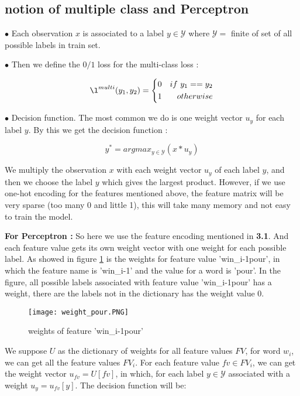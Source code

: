 \documentclass{article}
\def\YY{{\mathcal{Y}}}
\begin{document}
\subsection{notion of multiple class and Perceptron}
$\bullet$ Each observation $x$ is associated to a label $y \in \YY$ where $\YY = $ finite of set of all possible labels in train set. 

$\bullet$ Then we define the $0/1$ loss for the multi-class loss : 

\begin{equation}
\l^{multi}(y_1, y_2) = \left\{
\begin{aligned}
0 & & if\ y_1 == y_2\\
1 & &otherwise
\end{aligned}
\right.
\end{equation}

$\bullet$ Decision function. The most common we do is one weight vector $u_y$ for each label $y$. By this we get the decision function :

\begin{equation}
y^* = argmax_{y \in \YY} (x*u_y)
\end{equation}

We multiply the observation $x$ with each weight vector $u_y$ of each label $y$, and then we choose the label $y$ which gives the largest product. However, if we use one-hot encoding for the features mentioned above, the feature matrix will be very sparse (too many 0 and little 1), this will take many memory and not easy to train the model.

\textbf{For Perceptron : } So here we use the feature encoding mentioned in \textbf{3.1}. And each feature value gets its own weight vector with one weight for each possible label. As showed in figure \ref{figure2} is the weights for feature value 'win\_i-1pour', in which the feature name is 'win\_i-1' and the value for a word is 'pour'. In the figure, all possible labels associated with feature value 'win\_i-1pour' has a weight, there are the labels not in the dictionary has the weight value 0.

\begin{figure}[ht]
\centering
\texttt{[image: weight\_pour.PNG]}
\caption{weights of feature 'win\_i-1pour'}
\label{figure2}
\end{figure}

We suppose $U$ as the dictionary of weights for all feature values $FV$,  for word $w_i$, we can get all the feature values $FV_i$. For each feature value $fv \in FV_i$, we can get the weight vector $u_{fv} = U[fv]$, in which, for each label $y \in \YY$ associated with a weight $u_y = u_{fv} [y]$. The decision function will be:
\end{document}
